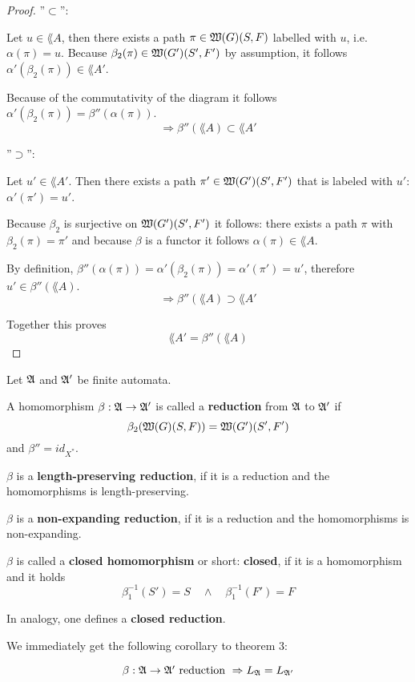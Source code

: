 \begin{proof} 
''$\subset$'':

Let $u \in \lang{A}$, then there exists a path $\pi \in \mbox{$\mathfrak{W}({G})$}(S, F)$
labelled with $u$, i.e. $\alpha(\pi) = u$. Because $\beta_2(\pi) \in
\mbox{$\mathfrak{W}({G'})$}(S',F')$ by assumption, it follows $\alpha'(\beta_2(\pi)) \in
\lang{A'}$.

Because of the commutativity of the diagram it follows $ \alpha'(\beta_2(\pi))
= \beta''(\alpha(\pi))$.
\[ \Rightarrow \beta''(\lang{A}) \subset \lang{A'} \]

''$\supset$'':

Let $u' \in \lang{A'}$. Then there exists a path $\pi' \in \mbox{$\mathfrak{W}({G'})$}(S', F')$
that is labeled with $u'$: $\alpha'(\pi') = u'$.

Because $\beta_2$ is surjective on $\mbox{$\mathfrak{W}({G'})$}(S', F')$ it follows: there
exists a path $\pi$ with $\beta_2(\pi) = \pi'$ and because $\beta$ is a functor
it follows $\alpha(\pi) \in \lang{A}$.

By definition, $\beta''(\alpha(\pi)) = \alpha'(\beta_2(\pi)) = \alpha'(\pi') =
u'$, therefore $u' \in \beta''(\lang{A})$.
\[ \Rightarrow  \beta''(\lang{A}) \supset \lang{A'} \]

Together this proves \[ \lang{A'} = \beta''(\lang{A}) \]
\end{proof}

\begin{definition}
Let $\mbox{$\mathfrak{A}$}$ and $\mbox{$\mathfrak{A'}$}$ be finite automata.

A homomorphism $\beta : \mbox{$\mathfrak{A \to \mbox{$\mathfrak{A'}$}}$}$ is called a {\bf reduction} from
$\mbox{$\mathfrak{A}$}$ to $\mbox{$\mathfrak{A'}$}$ if \[ \beta_2(\mbox{$\mathfrak{W}({G})$}(S, F)) = \mbox{$\mathfrak{W}({G'})$}(S', F') \]
and $\beta'' = id_{X^*}$.

$\beta$ is a {\bf length-preserving reduction}, if it is a reduction and the
homomorphisms is length-preserving.

$\beta$ is a {\bf non-expanding reduction}, if it is a
reduction and the homomorphisms is non-expanding.

$\beta$	 is called a {\bf closed homomorphism} or short: {\bf closed}, if it is
a homomorphism and it holds \[ \beta_1^{-1}(S') = S \quad\wedge\quad
\beta_1^{-1}(F') = F
\]

In analogy, one defines a {\bf closed reduction}.
\end{definition}

We immediately get the following corollary to theorem 3:

\begin{corollary}
\[ \beta : \mbox{$\mathfrak{A}$} \to \mbox{$\mathfrak{A'}$} \mbox{ reduction } \Rightarrow \mbox{$L_{\mathfrak{A}}$} =
\mbox{$L_{\mathfrak{A'}}$} \]
\end{corollary}

